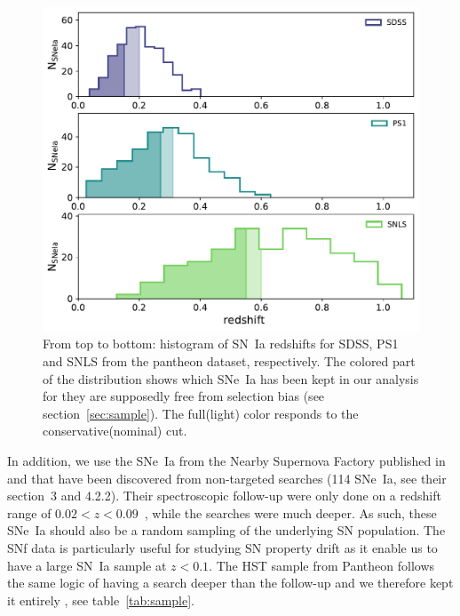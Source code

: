 \documentclass[]{aa} %
\newcommand{\nn}[1]{{\textcolor[rgb]{1, 0.27, 0}{#1}}}
\begin{document}
\begin{figure}
    \centering
    \includegraphics[width=0.9\linewidth]{Article_figures/hist_surveys_cuts.pdf}
    \caption{From top to bottom: histogram of SN~Ia redshifts for SDSS, PS1 and
    SNLS from the pantheon dataset, respectively. The colored part of the
distribution shows which SNe~Ia has been kept in our analysis for they are
supposedly free from selection bias (see section~\ref{sec:sample}). The
full(light) color responds to the conservative(nominal) cut.}
    \label{fig:cuts}
\end{figure}

In addition, we use the SNe~Ia from the Nearby Supernova Factory
\citep[SNfactory][]{aldering2004} published in \cite{rigault2018} and that have
been discovered from non-targeted searches (114 SNe~Ia, see their section~3 and
4.2.2). \nn{Their spectroscopic follow-up were only done on a redshift range of
$0.02<z<0.09$~\citep[as in ][]{rigault2018}, while the searches were much
deeper. As such, these SNe~Ia} should also be a random sampling of the underlying
SN population. The SNf data is particularly useful for studying SN property
drift as it enable us to have a large SN~Ia sample at $z<0.1$.  The HST sample
from Pantheon follows the same logic of having a search deeper than the
follow-up and we therefore kept it entirely \citep{FIND BACK THE REF}, see
table~\ref{tab:sample}.
\end{document}
